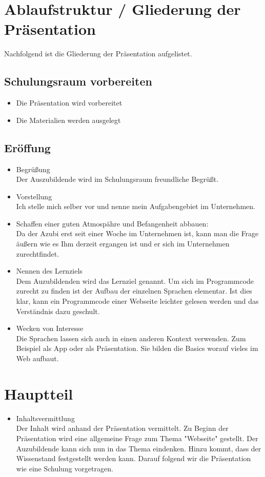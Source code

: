 \documentclass[a4paper, 12pt]{article}
\begin{document}
	\section{Ablaufstruktur / Gliederung der Präsentation}
	Nachfolgend ist die Gliederung der Präsentation aufgelistet.
	
	\subsection{Schulungsraum vorbereiten}
		\begin{itemize}
			\item Die Präsentation wird vorbereitet
			\item Die Materialien werden ausgelegt
		\end{itemize}
	\subsection{Eröffung}
		\begin{itemize}
			\item Begrüßung\\
			Der Auszubildende wird im Schulungsraum freundliche Begrüßt.
			\item Vorstellung\\
			Ich stelle mich selber vor und nenne mein Aufgabengebiet im Unternehmen.
			\item Schaffen einer guten Atmospähre und Befangenheit abbauen:\\
			Da der Azubi erst seit einer Woche im Unternehmen ist, kann man die Frage äußern wie es Ihm derzeit ergangen ist und er sich im Unternehmen zurechtfindet.
			\item Nennen des Lernziels\\
			Dem Auzubildenden wird das Lernziel genannt. Um sich im Programmcode zurecht zu finden ist der Aufbau der einzelnen Sprachen elementar. Ist dies klar, kann ein Programmcode einer Webseite leichter gelesen werden und das Verständnis dazu geschult.
			\item Wecken von Interesse\\
			Die Sprachen lassen sich auch in einen anderen Kontext verwenden. Zum Beispiel als App oder als Präsentation. Sie bilden die Basics worauf vieles im Web aufbaut.
		\end{itemize}
	\section{Hauptteil}
	\begin{itemize}
		\item Inhaltsvermittlung\\
			Der Inhalt wird anhand der Präsentation vermittelt. Zu Beginn der Präsentation wird eine allgemeine Frage zum Thema "Webseite" gestellt. Der Auzubildende kann sich nun in das Thema eindenken. Hinzu kommt, dass der Wissenstand festgestellt werden kann. Darauf folgend wir die Präsentation wie eine Schulung vorgetragen.
	\end{itemize}
\end{document}
